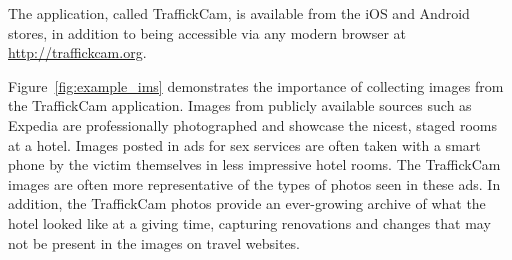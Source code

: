 The application, called TraffickCam, is available from the iOS and Android stores, in addition to being accessible via any modern browser at \url{http://traffickcam.org}.

Figure~\ref{fig:example_ims} demonstrates the importance of collecting images from the TraffickCam application. Images from publicly available sources such as Expedia are professionally photographed and showcase the nicest, staged rooms at a hotel. Images posted in ads for sex services are often taken with a smart phone by the victim themselves in less impressive hotel rooms. The TraffickCam images are often more representative of the types of photos seen in these ads. In addition, the TraffickCam photos provide an ever-growing archive of what the hotel looked like at a giving time, capturing renovations and changes that may not be present in the images on travel websites.

